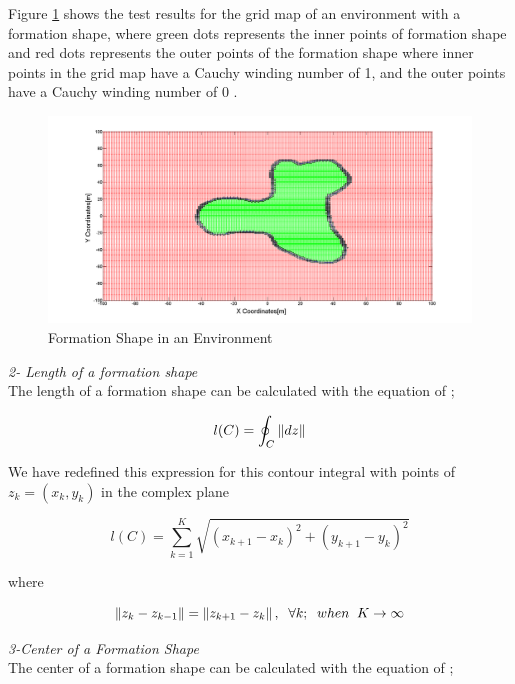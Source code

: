 Figure \ref{iceride_disarida_refe} shows the test results for the grid map of an environment with a formation shape, where green dots represents the inner points of formation shape and red dots represents the outer points of the formation shape where inner points in the grid map have a Cauchy winding number of 1, and the outer points have a Cauchy winding number of 0 .

\begin{figure}[H]
\centering
\captionsetup{format=hang,justification=centerfirst}
\caption{Formation Shape in an Environment} \label{iceride_disarida_refe}
\includegraphics[scale = 0.28]{iceride_disarida}
\end{figure}

\textit{ 	2- Length of a formation shape} \\ 
The length of a formation shape can be calculated with the equation of \cite{17};
		
\begin{equation}
l(C)= \oint_C \left\lVert dz\right\rVert
\end{equation}
		
We have redefined this expression for this contour integral with points of   $z_k = (x_k,y_k)$ in the complex plane

\begin{equation}
l(C) = \sum_{k=1}^{K}\sqrt{(x_{k+1} - x_k)^2 + (y_{k+1} - y_k)^2}
\end{equation}

where

\begin{equation}
\left\lVert z_k - z_{k-1}\right\rVert = \left\lVert z_{k+1} - z_k\right\rVert, \hspace{0.2cm}  \forall k ;  \hspace{0.2cm} when  \hspace{0.2cm} K \to\infty
\end{equation}
		
\textit{ 	3-Center of a Formation Shape} \\ 	
The center of a formation shape can be calculated with the equation of \cite{17};

